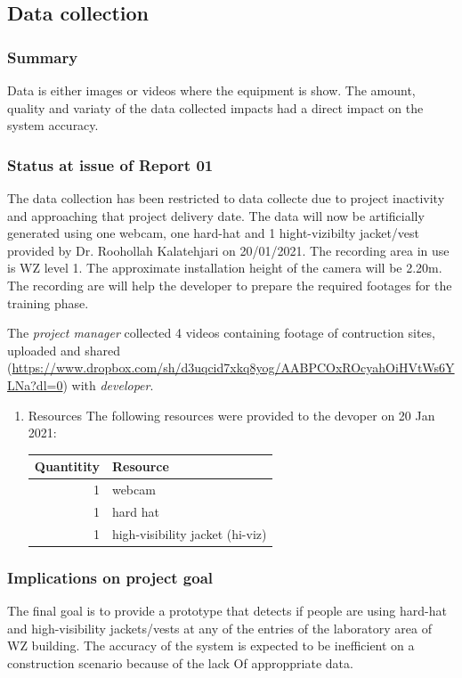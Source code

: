 \documentclass{article}
\begin{document}
\subsection{Data collection}
\label{sec:org37375c5}

\subsubsection{Summary}
\label{sec:orgdeedf11}
Data is either images or videos where the equipment is show.
The amount, quality and variaty of the data collected impacts had a direct impact on the system accuracy. 

\subsubsection{Status at issue of Report 01}
\label{sec:org33a1f66}
The data collection has been restricted to data collecte due to project inactivity and approaching that project delivery date.
The data will now be artificially generated using one webcam, one hard-hat and 1 hight-vizibilty jacket/vest provided by Dr. Roohollah Kalatehjari on 20/01/2021.
The recording area in use is WZ level 1.
The approximate installation height of the camera will be 2.20m. 
The recording are will help the developer to prepare the required footages for the training phase.

The \emph{project manager} collected 4 videos containing footage of contruction sites, uploaded and shared (\url{https://www.dropbox.com/sh/d3uqcid7xkq8yog/AABPCOxROcyahOiHVtWs6YLNa?dl=0}) with \emph{developer}.

\begin{enumerate}
\item Resources
\label{sec:orgea80c75}
The following resources were provided to the devoper on 20 Jan 2021:

\begin{center}
\begin{tabular}{rl}
Quantitity & Resource\\
\hline
1 & webcam\\
1 & hard hat\\
1 & high-visibility jacket (hi-viz)\\
\end{tabular}
\end{center}
\end{enumerate}

\subsubsection{Implications on project goal}
\label{sec:org090bc74}
The final goal is to provide a prototype that detects if people are using hard-hat and high-visibility jackets/vests at any of the entries of the laboratory area of WZ building.
The accuracy of the system is expected to be inefficient on a construction scenario because of the lack Of approppriate data.
\end{document}
